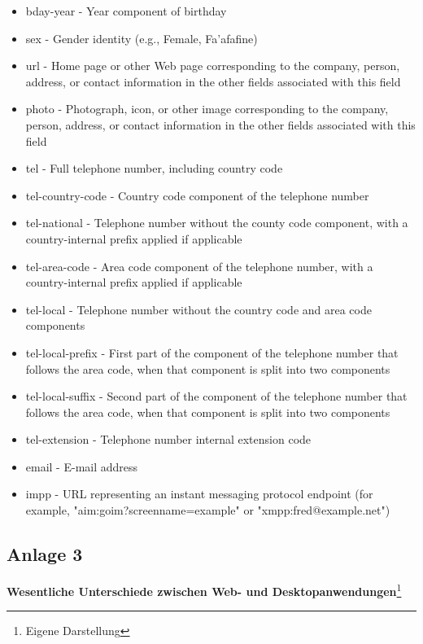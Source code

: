 \begin{itemize}
\item bday-year - Year component of birthday
\item sex - Gender identity (e.g., Female, Fa’afafine)
\item url - Home page or other Web page corresponding to the company, person, address, or contact information in the other fields associated with this field
\item photo - Photograph, icon, or other image corresponding to the company, person, address, or contact information in the other fields associated with this field
\item tel - Full telephone number, including country code
\item tel-country-code - Country code component of the telephone number
\item tel-national - Telephone number without the county code component, with a country-internal prefix applied if applicable
\item tel-area-code - Area code component of the telephone number, with a country-internal prefix applied if applicable
\item tel-local - Telephone number without the country code and area code components
\item tel-local-prefix - First part of the component of the telephone number that follows the area code, when that component is split into two components
\item tel-local-suffix - Second part of the component of the telephone number that follows the area code, when that component is split into two components
\item tel-extension - Telephone number internal extension code
\item email - E-mail address
\item impp - URL representing an instant messaging protocol endpoint (for example, "aim:goim?screenname=example" or "xmpp:fred@example.net")
\end{itemize}

\subsection*{Anlage 3}
\label{subsec: Anlage3}

\textbf{Wesentliche Unterschiede zwischen Web- und Desktopanwendungen}\footnote{Eigene Darstellung}



